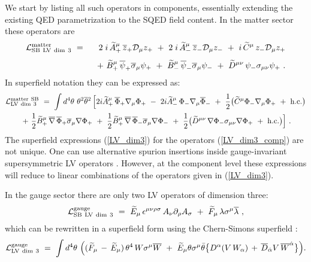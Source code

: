 \documentclass[12pt]{revtex4}
\begin{document}
We start by listing all such operators in components, essentially
extending the existing QED parametrization \cite{Kost1}  to the SQED
field content. In the matter sector these 
operators are  
%
\begin{eqnarray}
{\cal L}_{\rm SB~LV~dim~3}^{\rm matter} 
&~=~& 
2\;i\, \widetilde{A}_+^\mu\, \overline{z}_+ \mathcal{D}_\mu z_+ 
~+~ 2\;i\, \widetilde{A}_-^\mu\, \overline{z}_-\mathcal{D}_\mu z_- 
~+~i\, \widetilde{C}^\mu\, z_- \mathcal{D}_\mu z_+ 
\label{LV_dim3_comp}
\\[1ex] 
\nonumber
&& 
~+~\widetilde{B}_+^\mu\, \overline{\psi}_+\overline{\sigma}_\mu \psi_+ 
~+~ \widetilde{B}_-^\mu\, \overline{\psi}_-\overline{\sigma}_\mu \psi_-
 ~+~\widetilde{D}^{\mu\nu}\, \psi_- \sigma_{\mu\nu} \psi_+~.
\end{eqnarray}
%
In superfield notation they can be expressed as:
\begin{gather}
{\cal L}_{\rm LV~dim~3}^{\rm matter~SB} ~=~  
\int d^4\theta~ \theta^2\overline{\theta}{}^2 \, \Big[
2i  \widetilde{A}_+^\mu\,\overline{\Phi}_+ \nabla_\mu \Phi_+
~-~ 2i \widetilde{A}_-^\mu\, \Phi_-  \nabla_\mu \overline{\Phi}_-  
~+~ \frac 12\big(\widetilde{C}^\mu  \Phi_- \nabla_\mu \Phi_+ 
~+~ \text{h.c.}\big) 
\nonumber\\
\label{LV_dim3}
~+~ \frac{1}{2} \widetilde{B}_+^\mu\, 
\overline{\nabla}\, \overline{\Phi}_+ \overline{\sigma}_\mu \nabla \Phi_+
~+~ \frac{1}{2}\widetilde{B}_+^\mu\, 
\overline{\nabla}\, \overline{\Phi}_- \overline{\sigma}_\mu \nabla \Phi_- 
~+~ \frac 12\big(
\widetilde{D}^{\mu\nu}\, \nabla \Phi_- \sigma_{\mu\nu} \nabla \Phi_+
~+~ \text{h.c.}\big)
\Big]~. 
\end{gather}
%
The superfield expressions (\ref{LV_dim3}) for the operators
(\ref{LV_dim3_comp}) are not unique.  One can use alternative spurion
insertions  inside gauge-invariant supersymmetric LV operators
\cite{GrootNibbelink:2004za}. However, at the component level these
expressions will reduce to linear combinations of the operators given
in (\ref{LV_dim3}).


In the gauge sector there are only two LV operators of dimension 
three: 
\begin{eqnarray}
{\cal L}_{\rm SB~LV~dim~3}^{\rm gauge} ~=~ 
\widetilde{E}_\mu\, \epsilon^{\mu\nu\rho\sigma}\, 
A_\nu \partial_\rho A_\sigma  ~+~ 
\widetilde{F}_\mu\, \lambda \sigma^\mu \overline{\lambda} 
~,
\end{eqnarray}
%
which can be rewritten in a superfield form using the 
Chern-Simons superfield \cite{Cecotti:1987nw}:
\begin{eqnarray}
\label{CSint}
{\cal L}_{\rm LV ~dim~3}^{\rm gauge} ~=~ \int d^4\theta~ 
\Big(
(\widetilde{F}_\mu \,-\,   \widetilde{E}_\mu)\, \theta^4\, 
 W \sigma^\mu \overline{W} 
~+~ \widetilde{E}_\mu\theta \sigma^\mu\bar\theta 
\big\{ 
D^\alpha (V\, W_\alpha) 
\,+\,  
\overline{D}_{\dot\alpha}V\, \overline{W}^{\dot\alpha}
\big\}
\Big).
\end{eqnarray}
%
\end{document}
